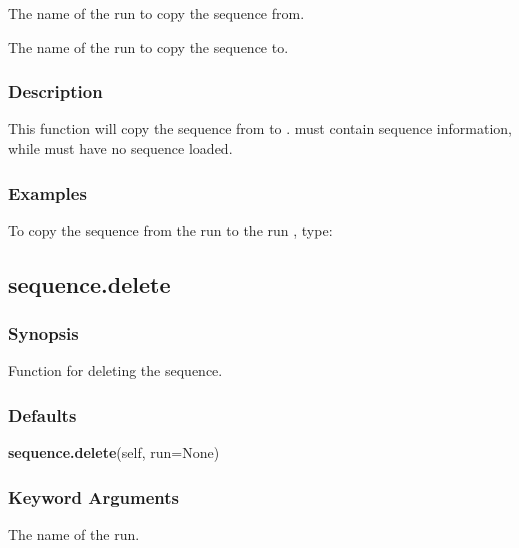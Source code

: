   The name of the run to copy  the sequence  from.

  The name of the run to copy  the sequence  to.

\subsubsection{Description}

This function will copy  the sequence  from 
 to 
.  
 must contain sequence 
information, while 
 must have no sequence  loaded.


\subsubsection{Examples}

To copy  the sequence  from the run 
 to the run 
, type:





\newpage

\subsection{sequence.delete}


\subsubsection{Synopsis}

Function for deleting the sequence.

\subsubsection{Defaults}

\textsf{\textbf{sequence.delete}(self, run=None)}


\subsubsection{Keyword Arguments}


  The name of the run.

